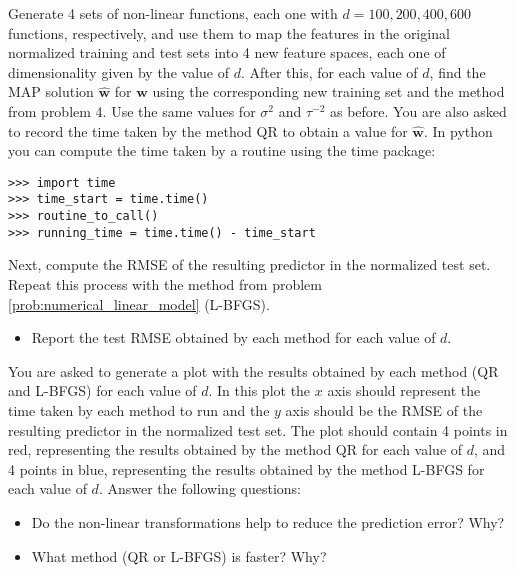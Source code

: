\documentclass[submit]{harvardml}
\theoremstyle{plain}
\begin{document}
\begin{problem}[14pts]\label{prob:non_linear_model}
Generate 4 sets of non-linear functions, each one with $d=100, 200, 400, 600$ functions, respectively, and use
them to map the features in the original normalized training and test sets into
4 new feature spaces, each one of dimensionality given by the value of $d$. After this, for each
value of $d$, find the MAP solution $\hat{\mathbf{w}}$ for $\mathbf{w}$ using the
corresponding new training set and the method from problem
4. Use the same values for $\sigma^2$ and $\tau^{-2}$ as before.
You are also asked to
record the time taken by the method QR to obtain a value for $\hat{\mathbf{w}}$.
In python  you can compute the time taken by a routine using the time package:
\begin{verbatim}
>>> import time
>>> time_start = time.time()
>>> routine_to_call()
>>> running_time = time.time() - time_start
\end{verbatim}
Next, compute the RMSE of the resulting predictor in the normalized test
set. Repeat this process with the method from problem
\ref{prob:numerical_linear_model} (L-BFGS).

\begin{itemize}
\item Report the test RMSE obtained by each method for each value of $d$.
\end{itemize}

You are asked to generate a plot
with the results obtained by each method (QR and L-BFGS)
for each value of $d$. In this plot
the $x$ axis should represent the time taken by each method to
run and the $y$ axis should be the RMSE of the resulting predictor in the
normalized test set. The plot should
contain 4 points in red, representing the results obtained by the method QR for
each value of $d$, and 4 points in blue, representing the results obtained
by the method L-BFGS for each value of $d$. Answer the following questions:
\begin{itemize}
\item Do the non-linear transformations help to reduce the prediction error? Why?
\item What method (QR or L-BFGS) is faster? Why?
\end{itemize}
\end{problem}
\end{document}
